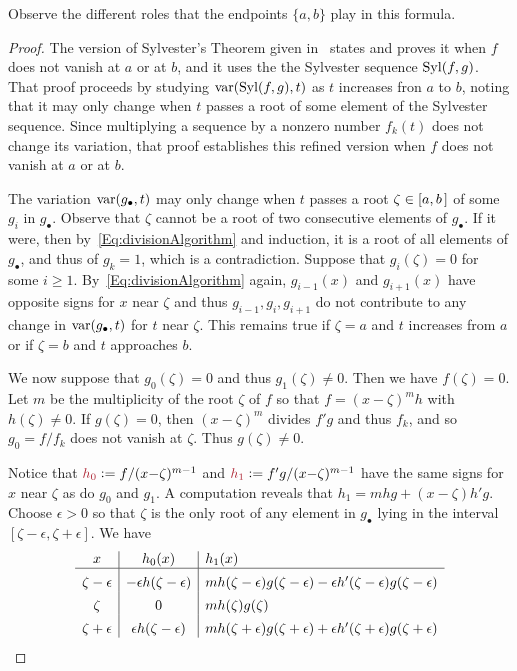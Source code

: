 Observe the different roles that the endpoints $\{a,b\}$ play in this formula.

\begin{proof}
  The version of Sylvester's Theorem given in~\cite[Thm.\ 2.55]{BPR} states and proves it 
  when $f$ does not vanish at $a$ or at $b$, and it uses the 
  the Sylvester sequence $\operatorname{{\rm Syl}}(f,g)$.
  That proof proceeds by studying $\operatorname{{\rm var}}(\operatorname{{\rm Syl}}(f,g), t)$ as $t$ increases fron $a$ to $b$, noting that it may only
  change when $t$ passes a root of some element of the Sylvester sequence.
  Since multiplying a sequence by a nonzero number $f_k(t)$ does not change its variation, that proof establishes this refined version
  when $f$ does not vanish at $a$ or at $b$. 

  The variation $\operatorname{{\rm var}}(g_\bullet,t)$ may only change when $t$ passes a root $\zeta\in[a,b\hspace{.05cm}]$ of some $g_i$ in
  $g_\bullet$. 
  Observe that $\zeta$ cannot be a root of two consecutive elements of $g_\bullet$.
  If it were, then by~\eqref{Eq:divisionAlgorithm} and induction, it is a root of all elements of $g_\bullet$, and thus of $g_k=1$, which is a
  contradiction.
  Suppose that $g_i(\zeta)=0$ for some $i\geq 1$.
  By~\eqref{Eq:divisionAlgorithm} again, $g_{i-1}(x)$ and $g_{i+1}(x)$ have opposite signs for $x$ near $\zeta$ and thus
  $g_{i-1},g_i,g_{i+1}$ do not contribute to any change in $\operatorname{{\rm var}}(g_\bullet,t)$ for $t$ near $\zeta$.
  This remains true if $\zeta=a$ and $t$ increases from $a$ or if $\zeta=b$ and $t$ approaches $b$.

  We now suppose that $g_0(\zeta)=0$ and thus $g_1(\zeta)\neq 0$.
  Then we have $f(\zeta)=0$.
  Let $m$ be the multiplicity of the root $\zeta$ of $f$ so that $f=(x{-}\zeta)^m h$ with $h(\zeta)\neq 0$.
  If $g(\zeta)=0$, then $(x{-}\zeta)^m$ divides $f'g$ and thus $f_k$, and so $g_0=f/f_k$ does not vanish at $\zeta$.
  Thus $g(\zeta)\neq 0$.

  Notice that $\defcolor{h_0}\vcentcolon=f/(x{-}\zeta)^{m-1}$ and $\defcolor{h_1}\vcentcolon=f'g/(x{-}\zeta)^{m-1}$ have the same signs for
  $x$ near $\zeta$ as do $g_0$ and $g_1$.
  A computation reveals that $h_1=mhg+(x{-}\zeta)h'g$.
 Choose $\epsilon>0$ so that $\zeta$ is the only root of any element in $g_\bullet$ lying in the interval
 $[\zeta-\epsilon,\zeta+\epsilon]$.
 We have
 \[
 \begin{array}{c|c|l}
   x & h_0(x) & h_1(x)\\\hline
   \zeta-\epsilon & -\epsilon h(\zeta-\epsilon)  &
        mh(\zeta-\epsilon)g(\zeta-\epsilon) - \epsilon h'(\zeta-\epsilon)g(\zeta-\epsilon)  \rule{0pt}{13pt}\\
   \zeta     &     0    &   mh(\zeta)g(\zeta)  \rule{0pt}{13pt}\\
   \zeta+\epsilon & \epsilon h(\zeta-\epsilon)  &
        mh(\zeta+\epsilon)g(\zeta+\epsilon) + \epsilon h'(\zeta+\epsilon)g(\zeta+\epsilon)  \rule{0pt}{13pt}
 \end{array}
 \]
 

\end{proof}
